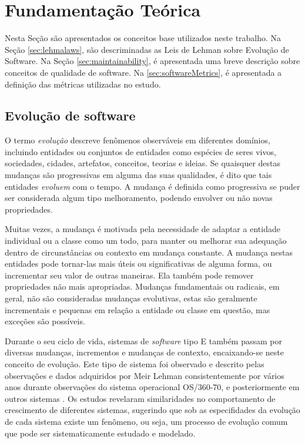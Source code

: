 \chapter{Fundamentação Teórica}
\label{chapter:fundamentos}

Nesta Seção são apresentados os conceitos base utilizados neste trabalho. Na Seção \ref{sec:lehmalaws}, são descriminadas as Leis de Lehman sobre Evolução de Software. Na Seção \ref{sec:maintainability}, é apresentada uma breve descrição sobre conceitos de qualidade de software. Na \ref{sec:softwareMetrics}, é apresentada a definição das métricas utilizadas no estudo.
\section{Evolução de software}
O termo \textit{evolução} descreve fenômenos observáveis em diferentes domínios, incluindo entidades ou conjuntos de entidades como espécies de seres vivos, sociedades, cidades, artefatos, conceitos, teorias e ideias. Se quaisquer destas mudanças são progressivas em alguma das suas qualidades, é dito que tais entidades \textit{evoluem} com o tempo. A mudança é definida como progressiva se puder ser considerada algum tipo melhoramento, podendo envolver ou não novas propriedades\cite{lehman1996laws}.

Muitas vezes, a mudança é motivada pela necessidade de adaptar a entidade individual ou a classe como um todo, para manter ou melhorar sua adequação dentro de circunstâncias ou contexto em mudança constante. A mudança nestas entidades pode tornar-las mais úteis ou significativas de alguma forma, ou incrementar seu valor de outras maneiras. Ela também pode remover propriedades não mais apropriadas. Mudanças fundamentais ou radicais, em geral, não são consideradas mudanças evolutivas, estas são geralmente incrementais e pequenas em relação a entidade ou classe em questão, mas exceções são possíveis.

Durante o seu ciclo de vida, sistemas de \textit{software} tipo E também passam por diversas mudanças, incrementos e mudanças de contexto, encaixando-se neste conceito de evolução. Este tipo de sistema foi observado e descrito pelas observações e dados adquiridos por Meir Lehman consistentemente por vários anos durante observações do sistema operacional OS/360-70, e posteriormente em outros sistemas \cite{lehman1979understanding,lehman1980programs,lehman1985program}. Os estudos revelaram similaridades no comportamento de crescimento de diferentes sistemas, sugerindo que sob as especifidades da evolução de cada sistema existe um fenômeno, ou seja, um processo de evolução comum que pode ser sistematicamente estudado e modelado. 

